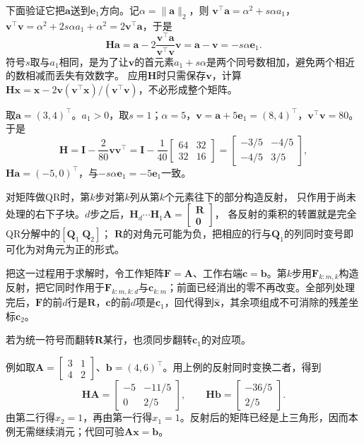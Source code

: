 下面验证它把$\bm a$送到$\bm e_1$方向。记$\alpha=\lVert\bm a\rVert_2$，则
$\bm v^\top\bm a=\alpha^2+s\alpha a_1$，$\bm v^\top\bm v=\alpha^2+2s\alpha a_1+\alpha^2=2\bm v^\top\bm a$，于是
\[
 \bm H\bm a=\bm a-2\frac{\bm v^\top\bm a}{\bm v^\top\bm v}\bm v=\bm a-\bm v=-s\alpha\bm e_1 .
\]
符号$s$取与$a_1$相同，是为了让$\bm v$的首元素$a_1+s\alpha$是两个同号数相加，避免两个相近的数相减而丢失有效数字。
应用$\bm H$时只需保存$\bm v$，计算$\bm H\bm x=\bm x-2\bm v(\bm v^\top\bm x)/(\bm v^\top\bm v)$，不必形成整个矩阵。

\begin{example}[二维向量的Householder反射]
\label{ex:ls-householder-two-dim}
取$\bm a=(3,4)^\top$。$a_1>0$，取$s=1$；$\alpha=5$，$\bm v=\bm a+5\bm e_1=(8,4)^\top$，$\bm v^\top\bm v=80$。于是
\[
 \bm H=\bm I-\frac{2}{80}\bm v\bm v^\top
 =\bm I-\frac1{40}\begin{bmatrix}64&32\\32&16\end{bmatrix}
 =\begin{bmatrix}-3/5&-4/5\\-4/5&3/5\end{bmatrix},
\]
$\bm H\bm a=(-5,0)^\top$，与$-s\alpha\bm e_1=-5\bm e_1$一致。
\end{example}

对矩阵做QR时，第$k$步对第$k$列从第$k$个元素往下的部分构造反射，
只作用于尚未处理的右下子块。$d$步之后，$\bm H_d\cdots\bm H_1\bm A=\left[\begin{smallmatrix}\bm R\\\bm0\end{smallmatrix}\right]$，
各反射的乘积的转置就是完全QR分解中的$[\bm Q_1\;\bm Q_2]$；
$\bm R$的对角元可能为负，把相应的行与$\bm Q_1$的列同时变号即可化为对角元为正的形式。

把这一过程用于求解时，令工作矩阵$\bm F=\bm A$、工作右端$\bm c=\bm b$。第$k$步用$\bm F_{k:m,k}$构造反射，把它同时作用于$\bm F_{k:m,k:d}$与$\bm c_{k:m}$；前面已经消出的零不再改变。全部列处理完后，$\bm F$的前$d$行是$\bm R$，$\bm c$的前$d$项是$\bm c_1$，回代得到$\hat{\bm x}$，其余项组成不可消除的残差坐标$\bm c_2$。

若为统一符号而翻转$\bm R$某行，也须同步翻转$\bm c_1$的对应项。

例如取$\bm A=\left[\begin{smallmatrix}3&1\\4&2\end{smallmatrix}\right]$、$\bm b=(4,6)^\top$。用上例的反射同时变换二者，得到
\[
 \bm H\bm A=\begin{bmatrix}-5&-11/5\\0&2/5\end{bmatrix},\qquad
 \bm H\bm b=\begin{bmatrix}-36/5\\2/5\end{bmatrix}.
\]
由第二行得$x_2=1$，再由第一行得$x_1=1$。反射后的矩阵已经是上三角形，因而本例无需继续消元；代回可验$\bm A\bm x=\bm b$。

